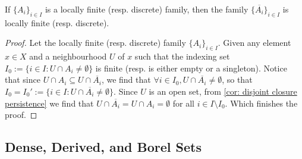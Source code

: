 \begin{proposition}
  If \(\{A_i\}_{i \in I}\) is a locally finite (resp. discrete) family, then the
  family \(\{\overline{A_i}\}_{i \in I}\) is locally finite (resp. discrete).
\end{proposition}

\begin{proof}
  Let the locally finite (resp. discrete) family \(\{A_i\}_{i \in I}\). Given
  any element \(x \in X\) and a neighbourhood \(U\) of \(x\) such that the
  indexing set \(I_0 := \{i \in I: U \cap A_i \neq \emptyset\}\) is finite
  (resp. is either empty or a singleton). Notice that since \(U \cap A_i
  \subseteq U \cap \overline{A_i}\), we find that \(\forall i \in I_0, U \cap
  \overline{A_i} \neq \emptyset\), so that \(I_0 = I_0' := \{i \in I: U \cap
  \overline{A_i} \neq \emptyset\}\). Since \(U\) is an open set, from \cref{cor:
  disjoint closure persistence} we find that \(U \cap \overline{A_i} = U \cap
  A_i = \emptyset\) for all \(i \in I \setminus I_0\). Which finishes the proof.
\end{proof}

\subsection{Dense, Derived, and Borel Sets}


